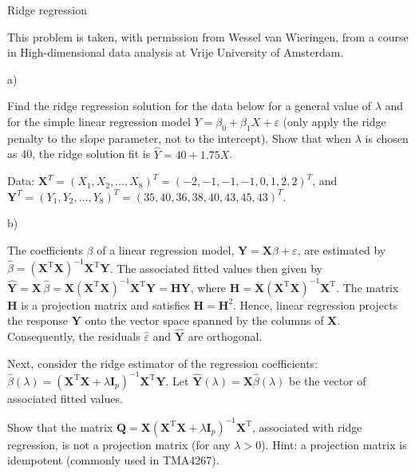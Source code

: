 \documentclass[
  ignorenonframetext,
]{beamer}
\begin{document}
\begin{frame}

\begin{block}{Ridge regression}

This problem is taken, with permission from Wessel van Wieringen, from a
course in High-dimensional data analysis at Vrije University of
Amsterdam.

\begin{block}{a)}

Find the ridge regression solution for the data below for a general
value of \(\lambda\) and for the simple linear regression model
\(Y = \beta_0 + \beta_1 X + \varepsilon\) (only apply the ridge penalty
to the slope parameter, not to the intercept). Show that when
\(\lambda\) is chosen as 40, the ridge solution fit is
\(\hat{Y} = 40 + 1.75 X\).

Data:
\(\mathbf{X}^T = (X_1, X_2, \ldots, X_{8})^T = (-2, -1, -1, -1, 0, 1, 2, 2)^T\),
and
\(\mathbf{Y}^T = (Y_1, Y_2, \ldots, Y_{8})^T = (35, 40, 36, 38, 40, 43, 45, 43)^T\).

\end{block}

\begin{block}{b)}

The coefficients \(\beta\) of a linear regression model,
\(\mathbf{Y} = \mathbf{X} \beta + \varepsilon\), are estimated by
\(\hat{\beta} = (\mathbf{X}^\mathrm{T} \mathbf{X})^{-1} \mathbf{X}^\mathrm{T} \mathbf{Y}\).
The associated fitted values then given by
\(\hat{\mathbf{Y}} = \mathbf{X} \, \hat{\beta} = \mathbf{X} (\mathbf{X}^\mathrm{T} \mathbf{X})^{-1} \mathbf{X}^\mathrm{T} \mathbf{Y} = \mathbf{H} \mathbf{Y}\),
where
\(\mathbf{H} = \mathbf{X} (\mathbf{X}^\mathrm{T} \mathbf{X})^{-1} \mathbf{X}^\mathrm{T}\).
The matrix \(\mathbf{H}\) is a projection matrix and satisfies
\(\mathbf{H} = \mathbf{H}^ 2\). Hence, linear regression projects the
response \(\mathbf{Y}\) onto the vector space spanned by the columns of
\(\mathbf{X}\). Consequently, the residuals \(\hat{\varepsilon}\) and
\(\hat{\mathbf{Y}}\) are orthogonal.

Next, consider the ridge estimator of the regression coefficients:
\(\hat{\beta}(\lambda) = (\mathbf{X}^\mathrm{T} \mathbf{X} + \lambda \mathbf{I}_{p})^{-1} \mathbf{X}^\mathrm{T} \mathbf{Y}\).
Let \(\hat{\mathbf{Y}}(\lambda) = \mathbf{X} \hat{\beta}(\lambda)\) be
the vector of associated fitted values.

Show that the matrix
\(\mathbf{Q} = \mathbf{X} (\mathbf{X}^\mathrm{T} \mathbf{X} + \lambda \mathbf{I}_{p})^{-1} \mathbf{X}^{\mathrm{T}}\),
associated with ridge regression, is not a projection matrix (for any
\(\lambda > 0\)). Hint: a projection matrix is idempotent (commonly used
in TMA4267).


\end{block}
\end{block}
\end{frame}
\end{document}
